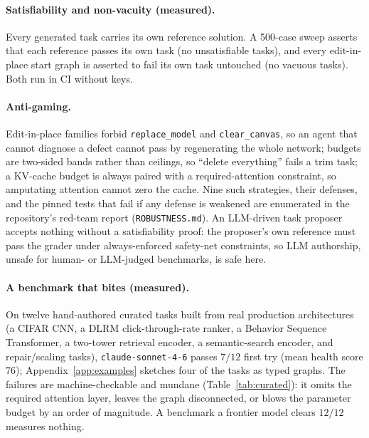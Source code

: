 \documentclass[11pt]{article}
\begin{document}
\paragraph{Satisfiability and non-vacuity (measured).} Every generated task carries its own reference solution. A 500-case sweep asserts that each reference passes its own task (no unsatisfiable tasks), and every edit-in-place start graph is asserted to fail its own task untouched (no vacuous tasks). Both run in CI without keys.

\paragraph{Anti-gaming.} Edit-in-place families forbid \texttt{replace\_model} and \texttt{clear\_canvas}, so an agent that cannot diagnose a defect cannot pass by regenerating the whole network; budgets are two-sided bands rather than ceilings, so ``delete everything'' fails a trim task; a KV-cache budget is always paired with a required-attention constraint, so amputating attention cannot zero the cache. Nine such strategies, their defenses, and the pinned tests that fail if any defense is weakened are enumerated in the repository's red-team report (\texttt{ROBUSTNESS.md}). An LLM-driven task proposer accepts nothing without a satisfiability proof: the proposer's own reference must pass the grader under always-enforced safety-net constraints, so LLM authorship, unsafe for human- or LLM-judged benchmarks, is safe here.

\paragraph{A benchmark that bites (measured).} On twelve hand-authored curated tasks built from real production architectures (a CIFAR CNN, a DLRM click-through-rate ranker, a Behavior Sequence Transformer, a two-tower retrieval encoder, a semantic-search encoder, and repair/scaling tasks), \texttt{claude-sonnet-4-6} passes $7/12$ first try (mean health score $76$); Appendix~\ref{app:examples} sketches four of the tasks as typed graphs. The failures are machine-checkable and mundane (Table~\ref{tab:curated}): it omits the required attention layer, leaves the graph disconnected, or blows the parameter budget by an order of magnitude. A benchmark a frontier model clears $12/12$ measures nothing.
\end{document}
